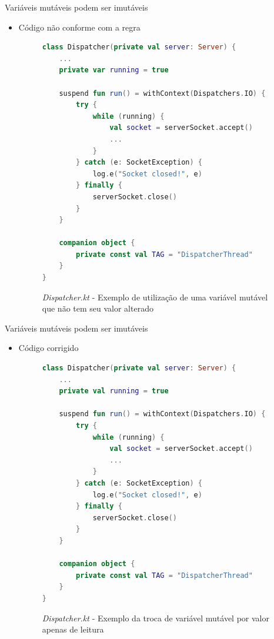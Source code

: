 \documentclass[brazilian]{beamer}
\begin{document}
\begin{frame}[fragile]{Variáveis mutáveis podem ser imutáveis}
    \begin{itemize}
        \item Código não conforme com a regra
        \begin{figure}[H]
            \centering
            \begin{lstlisting}[language=Kotlin]
class Dispatcher(private val server: Server) {
    ...
    private var running = true

    suspend fun run() = withContext(Dispatchers.IO) {
        try {
            while (running) {
                val socket = serverSocket.accept()
                ...
            }
        } catch (e: SocketException) {
            log.e("Socket closed!", e)
        } finally {
            serverSocket.close()
        }
    }

    companion object {
        private const val TAG = "DispatcherThread"
    }
}
            \end{lstlisting}
            \caption{\textit{Dispatcher.kt} - Exemplo de utilização de uma variável mutável que não tem seu valor alterado}
            \label{fig:detekt_var_could_be_val_before_example}
        \end{figure}
    \end{itemize}
\end{frame}

\begin{frame}[fragile]{Variáveis mutáveis podem ser imutáveis}
    \begin{itemize}
        \item Código corrigido
        \begin{figure}[H]
            \centering
            \begin{lstlisting}[language=Kotlin]
class Dispatcher(private val server: Server) {
    ...
    private val running = true
    
    suspend fun run() = withContext(Dispatchers.IO) {
        try {
            while (running) {
                val socket = serverSocket.accept()
                ...
            }
        } catch (e: SocketException) {
            log.e("Socket closed!", e)
        } finally {
            serverSocket.close()
        }
    }

    companion object {
        private const val TAG = "DispatcherThread"
    }
}
            \end{lstlisting}
            \caption{\textit{Dispatcher.kt} - Exemplo da troca de variável mutável por valor apenas de leitura}
            \label{fig:detekt_var_could_be_val_after_example}
        \end{figure}
    \end{itemize}
\end{frame}
\end{document}
